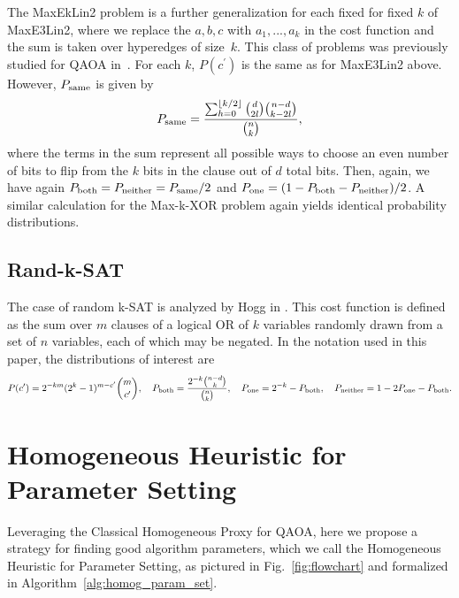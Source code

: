 \documentclass[superscriptaddress,pra,aps,10pt,longbibliography,notitlepage]{revtex4-1}
\newcommand{\Prob}[1]{\ensuremath{P_{\textnormal{#1}}}}
\newcommand{\Psame}{\Prob{same}}
\newcommand{\Pboth}{\Prob{both}}
\newcommand{\Pone}{\Prob{one}}
\newcommand{\Pneither}{\Prob{neither}}
\newcommand*\cp{c^\prime}
\begin{document}
The MaxEkLin2 problem is a further generalization for each fixed for fixed $k$ of MaxE3Lin2, where we replace the $a,b,c$ with $a_1,...,a_k$ in the cost function and the sum is taken over hyperedges of size~$k$. This class of problems was previously studied for QAOA in~\cite{marwaha2022bounds,chou2022limitations}. For each $k$, $P(\cp)$ is the same as for MaxE3Lin2 above. However, $\Psame$ is given by
\begin{equation}
    \Psame = \frac{\sum_{h=0}^{\lfloor k/2 \rfloor}\binom{d}{2l}\binom{n-d}{k-2l}}{\binom{n}{k}},
\end{equation}
where the terms in the sum represent all possible ways to choose an even number of bits to flip from the $k$ bits in the clause out of $d$ total bits. Then, again, we have again $\Pboth=\Pneither=\Psame/2$ and $\Pone=(1-\Pboth-\Pneither)/2$. A similar calculation for the Max-k-XOR problem again yields identical probability distributions. 


\subsection{Rand-k-SAT}

The case of random k-SAT is analyzed by Hogg in \cite{hogg00}. This cost function is defined as the sum over $m$ clauses of a logical OR of $k$ variables randomly drawn from a set of $n$ variables, each of which may be negated. 
In the notation used in this paper, the distributions of interest are
\begin{equation}
    P(\cp) = 2^{-km}(2^{k}-1)^{m-\cp}\binom{m}{\cp},\quad \Pboth=\frac{2^{-k}\binom{n-d}{k}}{\binom{n}{k}},\quad \Pone=2^{-k}-\Pboth,\quad
    \Pneither=1-2\Pone-\Pboth.
\end{equation}


\section{Homogeneous Heuristic for Parameter Setting}\label{homogeneous_parameter_setting}

Leveraging the Classical Homogeneous Proxy for QAOA, here we propose a strategy for finding good algorithm parameters, which we call the Homogeneous Heuristic for Parameter Setting, as pictured in Fig.~\ref{fig:flowchart} and formalized in Algorithm~\ref{alg:homog_param_set}. 
\end{document}
